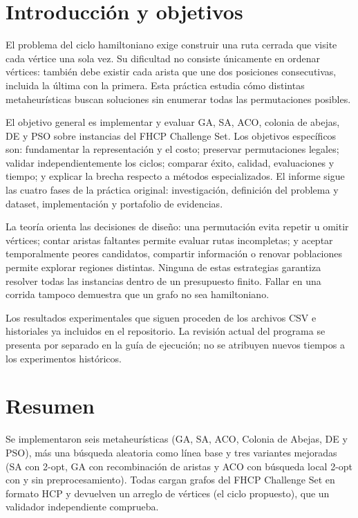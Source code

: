 \documentclass[
  spanish,
  12pt,
]{article}
\begin{document}
\section{Introducción y objetivos}
El problema del ciclo hamiltoniano exige construir una ruta cerrada que visite cada vértice una sola vez. Su dificultad no consiste únicamente en ordenar vértices: también debe existir cada arista que une dos posiciones consecutivas, incluida la última con la primera. Esta práctica estudia cómo distintas metaheurísticas buscan soluciones sin enumerar todas las permutaciones posibles.

El objetivo general es implementar y evaluar GA, SA, ACO, colonia de abejas, DE y PSO sobre instancias del FHCP Challenge Set. Los objetivos específicos son: fundamentar la representación y el costo; preservar permutaciones legales; validar independientemente los ciclos; comparar éxito, calidad, evaluaciones y tiempo; y explicar la brecha respecto a métodos especializados. El informe sigue las cuatro fases de la práctica original: investigación, definición del problema y dataset, implementación y portafolio de evidencias.

La teoría orienta las decisiones de diseño: una permutación evita repetir u omitir vértices; contar aristas faltantes permite evaluar rutas incompletas; y aceptar temporalmente peores candidatos, compartir información o renovar poblaciones permite explorar regiones distintas. Ninguna de estas estrategias garantiza resolver todas las instancias dentro de un presupuesto finito. Fallar en una corrida tampoco demuestra que un grafo no sea hamiltoniano.

Los resultados experimentales que siguen proceden de los archivos CSV e historiales ya incluidos en el repositorio. La revisión actual del programa se presenta por separado en la guía de ejecución; no se atribuyen nuevos tiempos a los experimentos históricos.
\section{Resumen}\label{resumen}

Se implementaron seis metaheurísticas (GA, SA, ACO, Colonia de Abejas,
DE y PSO), más una búsqueda aleatoria como línea base y tres variantes
mejoradas (SA con 2-opt, GA con recombinación de aristas y ACO con
búsqueda local 2-opt con y sin preprocesamiento). Todas cargan grafos
del FHCP Challenge Set en formato HCP y devuelven un arreglo de vértices
(el ciclo propuesto), que un validador independiente comprueba.
\end{document}
